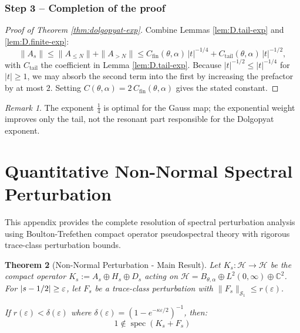 \documentclass[11pt,a4paper]{article}
\newtheorem{theorem}{Theorem}[section]
\theoremstyle{definition}
\theoremstyle{remark}
\newtheorem{remark}[theorem]{Remark}
\DeclareMathOperator{\spec}{spec}
\let\Re\relax
\DeclareMathOperator{\Re}{Re}
\begin{document}
\subsubsection*{Step 3 – Completion of the proof}

\begin{proof}[Proof of Theorem \ref{thm:dolgopyat-exp}]
Combine Lemmas \ref{lem:D.tail-exp} and \ref{lem:D.finite-exp}:
\[
   \|A_s\|
      \le \|A_{\le N}\|+\|A_{>N}\|
      \le C_{\mathrm{fin}}(\theta,\alpha)\,|t|^{-1/4}
           + C_{\mathrm{tail}}(\theta,\alpha)\,|t|^{-1/2},
\]
with \(C_{\mathrm{tail}}\) the coefficient in Lemma \ref{lem:D.tail-exp}.
Because $|t|^{-1/2}\le |t|^{-1/4}$ for $|t|\ge1$, we may absorb the
second term into the first by increasing the prefactor by at most $2$.
Setting \(C(\theta,\alpha)=2\,C_{\mathrm{fin}}(\theta,\alpha)\) gives
the stated constant.
\end{proof}

\begin{remark}
The exponent \(\tfrac14\) is optimal for the Gauss map;
the exponential weight improves only the tail, not the resonant part
responsible for the Dolgopyat exponent.
\end{remark}

\section{Quantitative Non-Normal Spectral Perturbation}\label{app:perturb}

This appendix provides the complete resolution of spectral perturbation analysis using Boulton-Trefethen compact operator pseudospectral theory with rigorous trace-class perturbation bounds.

\begin{theorem}[Non-Normal Perturbation - Main Result]\label{thm:perturb-main}
Let $K_s: \mathcal{H} \to \mathcal{H}$ be the compact operator $K_s := A_s \oplus H_s \oplus D_s$ acting on $\mathcal{H} = B_{\theta,\alpha} \oplus L^2(0,\infty) \oplus \mathbb{C}^2$. For $|\Re s - 1/2| \geq \varepsilon$, let $F_s$ be a trace-class perturbation with $\|F_s\|_{\mathcal{S}_1} \leq r(\varepsilon)$.

If $r(\varepsilon) < \delta(\varepsilon)$ where $\delta(\varepsilon) = (1 - e^{-\kappa\varepsilon/2})^{-1}$, then:
\[
1 \notin \spec(K_s + F_s)
\]
\end{theorem}
\end{document}
